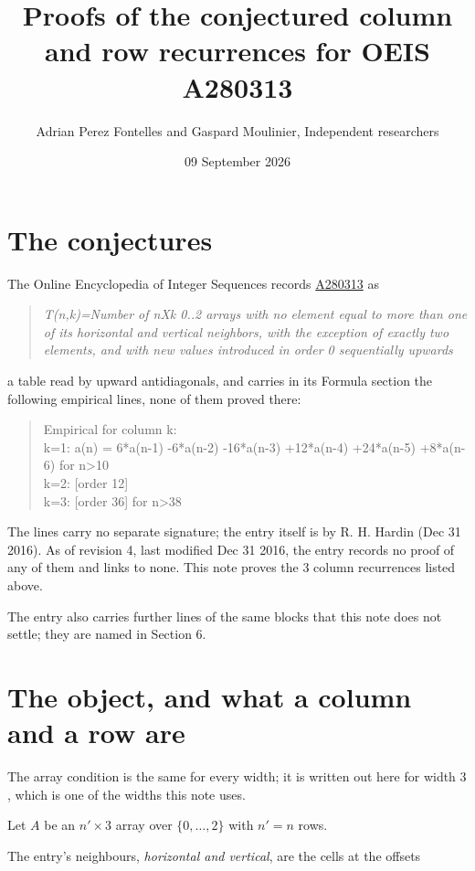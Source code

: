 \documentclass[11pt]{article}
\title{Proofs of the conjectured column and row recurrences for OEIS A280313}
\author{Adrian Perez Fontelles and Gaspard Moulinier, Independent researchers}
\date{09 September 2026}
\theoremstyle{definition}
\begin{document}
\maketitle
\section{The conjectures}

The Online Encyclopedia of Integer Sequences records \href{https://oeis.org/A280313}{A280313} as

\begin{quote}\itshape T(n,k)=Number of nXk 0..2 arrays with no element equal to more than one of its horizontal and vertical neighbors, with the exception of exactly two elements, and with new values introduced in order 0 sequentially upwards\end{quote}

a table read by upward antidiagonals, and carries in its Formula section the following empirical lines, none of them proved there:

\begin{quote}\ttfamily Empirical for column k:\\
k=1: a(n) = 6*a(n-1) -6*a(n-2) -16*a(n-3) +12*a(n-4) +24*a(n-5) +8*a(n-6) for n>10\\k=2: [order 12]\\k=3: [order 36] for n>38\end{quote}

The lines carry no separate signature; the entry itself is by R. H. Hardin (Dec 31 2016). As of revision 4, last modified Dec 31 2016, the entry records no proof of any of them and links to none. This note proves the 3 column recurrences listed above.

The entry also carries further lines of the same blocks that this note does not settle; they are named in Section 6.

\section{The object, and what a column and a row are}

The array condition is the same for every width; it is written out here for width $3$, which is one of the widths this note uses.

Let $A$ be an $n' \times 3$ array over $\{0,\dots,2\}$ with $n' = n$ rows.

The entry's neighbours, {\itshape horizontal and vertical}, are the cells at the offsets
\end{document}
